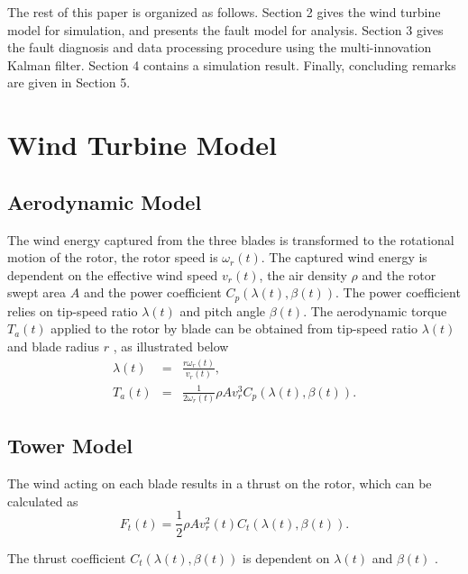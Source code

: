 \documentclass{article}
\begin{document}
The rest of this paper is organized as follows. Section 2 gives the wind
turbine model for simulation, and presents the fault model for
analysis. Section 3 gives the fault diagnosis and data processing
procedure using the multi-innovation Kalman filter. Section 4
contains a simulation result. Finally, concluding remarks are given in Section 5.

\section{Wind Turbine Model}


\subsection{Aerodynamic Model}

The wind energy captured from the three blades is transformed
to the rotational motion of the rotor, the rotor speed is $\omega_r(t)$.
The captured wind energy is dependent on the effective wind speed
$v_r(t)$, the air density $\rho$ and the rotor swept area $A$ and
the power coefficient $C_p(\lambda(t),\beta(t))$. The power
coefficient relies on tip-speed ratio $\lambda(t)$ and pitch
angle $\beta(t)$. The aerodynamic torque $T_a(t)$ applied to
the rotor by blade can be obtained from tip-speed ratio $\lambda(t)$
and blade radius $r$ \cite{ref:13}, as illustrated below
\begin{eqnarray}
  \lambda(t) &=& \frac{r\omega_r(t)}{v_r(t)}, \\
  T_a(t) &=& \frac{1}{2\omega_r(t)} \rho A v_r^3 C_p(\lambda(t),\beta(t)).
\end{eqnarray}



\subsection{Tower Model}

The wind acting on each blade results in a
thrust on the rotor, which can be calculated as \cite{ref:14}
\begin{equation} \label{eq.aero}
  F_t(t) = \frac{1}{2} \rho A v_r^2(t)C_t(\lambda(t),\beta(t)).
\end{equation}

The thrust coefficient  $C_t(\lambda(t),\beta(t))$ is
dependent on  $\lambda(t)$ and $\beta(t)$ .
\end{document}
